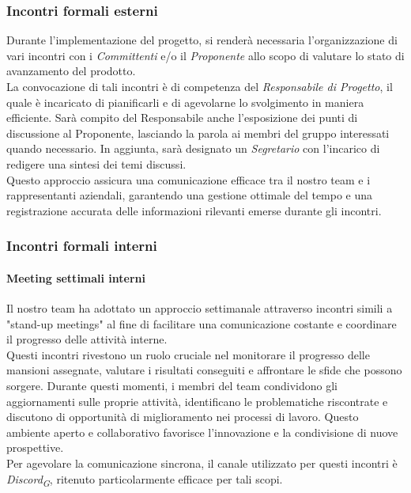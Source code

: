 \documentclass{article}
\begin{document}
        \subsubsection{Incontri formali esterni}
        Durante l'implementazione del progetto, si renderà necessaria l'organizzazione di vari incontri con i \textit{Committenti} e/o il \textit{Proponente} allo scopo di valutare lo stato di avanzamento del prodotto.\\
        La convocazione di tali incontri è di competenza del \textit{Responsabile di Progetto}, il quale è incaricato di pianificarli e di agevolarne lo svolgimento in maniera efficiente. Sarà compito del Responsabile anche l'esposizione dei punti di discussione al Proponente, lasciando la parola ai membri del gruppo interessati quando necessario.
        In aggiunta, sarà designato un \textit{Segretario} con l'incarico di redigere una sintesi dei temi discussi. \\
        Questo approccio assicura una comunicazione efficace tra il nostro team e i rappresentanti aziendali, garantendo una gestione ottimale del tempo e una registrazione accurata delle informazioni rilevanti emerse durante gli incontri.
               
        \subsubsection{Incontri formali interni}
        \paragraph{Meeting settimali interni}
        Il nostro team ha adottato un approccio settimanale attraverso incontri simili a "stand-up meetings" al fine di facilitare una comunicazione costante e coordinare il progresso delle attività interne.\\
        Questi incontri rivestono un ruolo cruciale nel monitorare il progresso delle mansioni assegnate, valutare i risultati conseguiti e affrontare le sfide che possono sorgere. Durante questi momenti, i membri del team condividono gli aggiornamenti sulle proprie attività, identificano le problematiche riscontrate e discutono di opportunità di miglioramento nei processi di lavoro. Questo ambiente aperto e collaborativo favorisce l'innovazione e la condivisione di nuove prospettive.\\
        Per agevolare la comunicazione sincrona, il canale utilizzato per questi incontri è \textit{Discord}\textsubscript{\textit{G}}, ritenuto particolarmente efficace per tali scopi.
\end{document}

